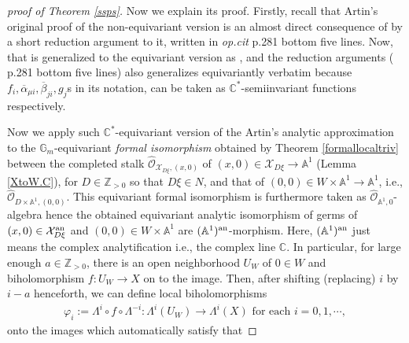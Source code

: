 \documentclass[12pt,a4paper]{amsart}
\theoremstyle{remark}
\theoremstyle{definition}
\def\C{\mathbb{C}}
\def\G{\mathbb{G}}
\def\Z{\mathbb{Z}}
\def\A{\mathbb{A}}
\def\X{\mathcal{X}}
\begin{document}
\begin{proof}[proof of Theorem \ref{ssps}]
Now we explain its proof. Firstly, 
recall that Artin's original proof of the non-equivariant version 
is an almost direct consequence of 
\cite[Theorem 1.2]{Artin} by a short reduction argument to it, written 
in {\it op.cit} p.281 bottom five lines. 
Now, that \cite[Theorem 1.2]{Artin} is generalized to the  
equivariant version as \cite[Theorem A]{BM}, and 
the reduction arguments (\cite{Artin} p.281 bottom five lines) 
also generalizes equivariantly verbatim because 
$f_i, \overline{\alpha}_{\mu i}, \overline{\beta}_{ji}, g_j$s in 
its notation, can be taken as $\C^*$-semiinvariant functions 
respectively. 

Now we apply such $\C^*$-equivariant version of the 
Artin's analytic approximation 
to the $\G_m$-equivariant {\it formal 
isomorphism} obtained by Theorem \ref{formallocaltriv} 
between the completed stalk 
$\widehat{\mathcal{O}}_{\X_{D\xi},(x,0)}$ of 
$(x,0)\in \X_{D\xi}\to \A^1$ (Lemma \ref{XtoW.C}), 
for $D\in \Z_{>0}$ 
so that $D\xi\in N$, 
and that of 
$(0,0)\in W\times \A^1\to \A^1$, i.e., 
$\widehat{\mathcal{O}}_{D\times \A^1,(0,0)}$. 
This equivariant formal isomorphism is furthermore taken as 
$\widehat{\mathcal{O}}_{\A^1,0}$-algebra hence the obtained 
equivariant analytic isomorphism of germs of $(x,0)\in \X_{D\xi}^{\rm an}$ 
and $(0,0)\in W\times \A^1$ are $(\A^1)^{\rm an}$-morphism. 
Here, $(\A^1)^{\rm an}$ just means the complex analytification i.e., 
the complex line $\C$. 
In particular, for large enough $a\in \Z_{>0}$, 
there is an open neighborhood $U_W$ of $0\in W$ and 
biholomorphism $f\colon U_W\to X$ on to the image. Then, 
after shifting (replacing) $i$ by $i-a$ henceforth, 
we can define local biholomorphisms 
\begin{align}
\varphi_i:=\Lambda^i \circ f\circ \Lambda^{-i}\colon \Lambda^i(U_W)\to 
\Lambda^i(X) \text{ for each }i=0,1,\cdots,
\end{align}
onto the images which automatically satisfy that 


\end{proof}
\end{document}
